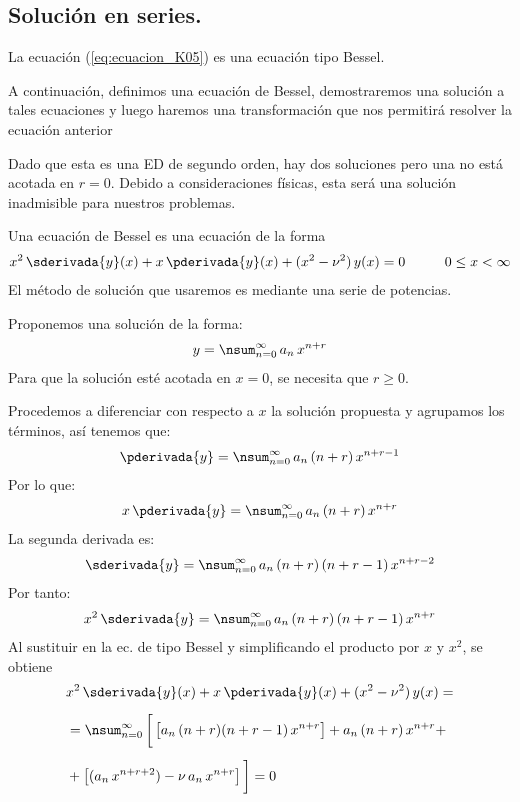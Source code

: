 \subsection{Solución en series.}

La ecuación (\ref{eq:ecuacion_K05}) es una ecuación tipo Bessel.
\par
A continuación, definimos una ecuación de Bessel, demostraremos una solución a tales ecuaciones y luego haremos una transformación que nos permitirá resolver la ecuación anterior
\par
Dado que esta es una ED de segundo orden, hay dos soluciones pero una no está acotada en $r = 0$. Debido a consideraciones físicas, esta será una solución inadmisible para nuestros problemas.
\par
Una ecuación de Bessel es una ecuación de la forma
\begin{align*}
x^{2} \, \sderivada{y} (x) + x \,\pderivada{y} (x) + (x^{2} - \nu^{2}) \, y(x) = 0 \hspace{1cm} 0 \leq x < \infty
\end{align*}
El método de solución que usaremos es mediante una serie de potencias.
\par
Proponemos una solución de la forma:
\begin{align*}
y = \nsum_{n=0}^{\infty} \, a_{n} \, x^{n+r}
\end{align*}
Para que la solución esté acotada en $x = 0$, se necesita que $r \geq 0$.
\par
Procedemos a diferenciar con respecto a $x$ la solución propuesta y agrupamos los términos, así tenemos que:
\begin{align*}
\pderivada{y} = \nsum_{n=0}^{\infty} \, a_{n} \, (n + r) \, x^{n+r-1}
\end{align*}
Por lo que:
\begin{align*}
x \, \pderivada{y} = \nsum_{n=0}^{\infty} \, a_{n} \, (n + r) \, x^{n+r}
\end{align*}
La segunda derivada es:
\begin{align*}
\sderivada{y} = \nsum_{n=0}^{\infty} \, a_{n} \, (n + r) \, (n + r - 1) \, x^{n+r-2}
\end{align*}
Por tanto:
\begin{align*}
x^{2} \, \sderivada{y} = \nsum_{n=0}^{\infty} \, a_{n} \, (n + r) \, (n + r - 1) \, x^{n+r}
\end{align*}
Al sustituir en la ec. de tipo Bessel y simplificando el producto por $x$ y $x^{2}$, se obtiene
\begin{align*}
&x^{2} \, \sderivada{y} (x) + x \,\pderivada{y} (x) + (x^{2} - \nu^{2}) \, y(x) = \\[0.5em]
&= \nsum_{n=0}^{\infty} \, \bigg[ \left[ a_{n} \, (n + r) (n + r -1) \, x^{n+r} \right] + a_{n} \, (n + r) \, x^{n+r} + \\[0.5em]
&+ \left[ (a_{n} \, x^{n+r+2} ) - \nu \, a_{n} \, x^{n+r} \right] \bigg] = 0
\end{align*}
